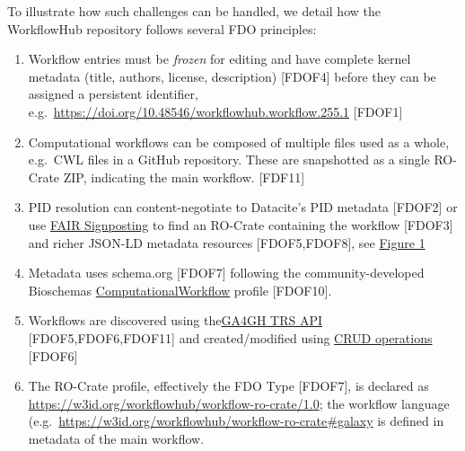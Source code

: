 To illustrate how such challenges can be handled, we detail how the
WorkflowHub repository follows several FDO principles:

\begin{enumerate}

\item
  Workflow entries must be \emph{frozen} for editing and have complete
  kernel metadata (title, authors, license, description) {[}FDOF4{]}
  before they can be assigned a persistent identifier,
  e.g.~\url{https://doi.org/10.48546/workflowhub.workflow.255.1}
  {[}FDOF1{]}
\item
  Computational workflows can be composed of multiple files used as a
  whole, e.g.~CWL files in a GitHub repository. These are snapshotted as
  a single RO-Crate ZIP, indicating the main workflow. {[}FDF11{]}
\item
  PID resolution can content-negotiate to Datacite's PID metadata
  {[}FDOF2{]} or use \href{https://signposting.org/FAIR/}{FAIR
  Signposting} to find an RO-Crate containing the workflow {[}FDOF3{]}
  and richer JSON-LD metadata resources {[}FDOF5,FDOF8{]}, see
  \protect\hyperlink{fig:signposting}{Figure 1}
\item
  Metadata uses schema.org {[}FDOF7{]} following the community-developed
  Bioschemas
  \href{https://bioschemas.org/profiles/ComputationalWorkflow/1.0-RELEASE}{ComputationalWorkflow}
  profile {[}FDOF10{]}.
\item
  Workflows are discovered using
  the\href{https://about.workflowhub.eu/developer/trs/}{GA4GH TRS API}
  {[}FDOF5,FDOF6,FDOF11{]} and created/modified using
  \href{https://workflowhub.eu/api}{CRUD operations} {[}FDOF6{]}
\item
  The RO-Crate profile, effectively the FDO Type {[}FDOF7{]}, is
  declared as \url{https://w3id.org/workflowhub/workflow-ro-crate/1.0};
  the workflow language
  (e.g.~\url{https://w3id.org/workflowhub/workflow-ro-crate\#galaxy} is
  defined in metadata of the main workflow.
\end{enumerate}

